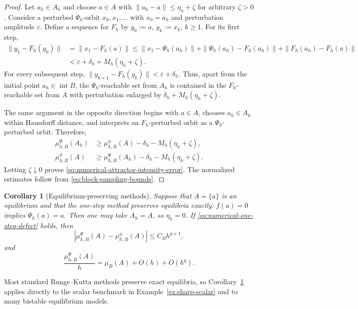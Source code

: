 \documentclass[pdflatex,sn-mathphys-num]{sn-jnl}
\numberwithin{equation}{section}
\theoremstyle{thmstyleone}%
\newtheorem{corollary}[theorem]{Corollary}
\theoremstyle{definition}
\theoremstyle{remark}
\begin{document}
\begin{proof}
Let $a_h\in A_h$ and choose $a\in A$ with $\|a_h-a\|\leq\eta_h+\zeta$ for arbitrary $\zeta>0$. Consider a perturbed $\Psi_h$-orbit $x_0,x_1,\ldots$ with $x_0=a_h$ and perturbation amplitude $\varepsilon$. Define a sequence for $F_h$ by $y_0:=a$, $y_k:=x_k$, $k\geq1$. For its first step,
\begin{align*}
    \|y_1-F_h(y_0)\|
    &=
    \|x_1-F_h(a)\| \leq
    \|x_1-\Psi_h(a_h)\|
    +
    \|\Psi_h(a_h)-F_h(a_h)\|
    +
    \|F_h(a_h)-F_h(a)\|\\[2pt]
    &<
    \varepsilon+\delta_h
    +M_h(\eta_h+\zeta).
\end{align*}
For every subsequent step, $\|y_{k+1}-F_h(y_k)\| < \varepsilon+\delta_h$. Thus, apart from the initial point $a_h\in\operatorname{int}B$, the $\Psi_h$-reachable set from $A_h$ is contained in the $F_h$-reachable set from $A$ with perturbation enlarged by $\delta_h+M_h(\eta_h+\zeta)$.

The same argument in the opposite direction begins with $a\in A$, chooses $a_h\in A_h$ within Hausdorff distance, and interprets an $F_h$-perturbed orbit as a $\Psi_h$-perturbed orbit. Therefore, 
\[
\begin{aligned}
    \mu_{h,B}^{\Psi}(A_h)
    &\geq
    \mu_{h,B}^{\phi}(A)
    -\delta_h-M_h(\eta_h+\zeta),\\
    \mu_{h,B}^{\phi}(A)
    &\geq
    \mu_{h,B}^{\Psi}(A_h)
    -\delta_h-M_h(\eta_h+\zeta).
\end{aligned}
\]
Letting $\zeta\downarrow0$ proves \eqref{eq:numerical-attractor-intensity-error}. The normalized estimates follow from \eqref{eq:block-sampling-bounds}.
\end{proof}

\begin{corollary}[Equilibrium-preserving methods]
\label{cor:equilibrium-preserving}
Suppose that $A=\{a\}$ is an equilibrium and that the one-step method preserves equilibria exactly: $f(a)=0$ implies $\Psi_h(a)=a$. Then one may take $A_h=A$, so $\eta_h=0$. If
\eqref{eq:numerical-one-step-defect} holds, then
\[
    \left|
    \mu_{h,B}^{\Psi}(A)
    -
    \mu_{h,B}^{\phi}(A)
    \right|
    \leq
    C_Bh^{q+1},
\]
and
\[
    \frac{\mu_{h,B}^{\Psi}(A)}h
    =
    \mu_B(A)+O(h)+O(h^q).
\]
\end{corollary}

Most standard Runge--Kutta methods preserve exact equilibria, so Corollary~\ref{cor:equilibrium-preserving} applies directly to the scalar benchmark in Example~\ref{ex:sharp-scalar} and to many bistable equilibrium models.
\end{document}

